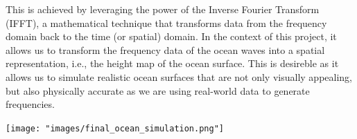 This is achieved by leveraging the power of the Inverse Fourier Transform (IFFT), a mathematical technique that transforms data 
from the frequency domain back to the time (or spatial) domain. In the context of this project, 
it allows us to transform the frequency data of the ocean waves into a spatial representation, i.e., the height map of the ocean surface. This is
desireble as it allows us to simulate realistic ocean surfaces that are not only visually appealing, but also physically accurate as 
we are using real-world data to generate frequencies.

\begin{minipage}{1\textwidth}
    \centering
    \texttt{[image: "images/final\_ocean\_simulation.png"]}
    \label{fig:ocean_simulation}
\end{minipage}

